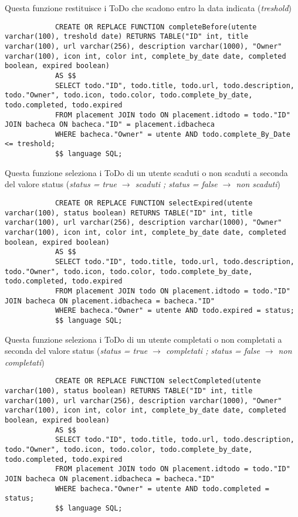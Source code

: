 \documentclass{article}
\begin{document}
		Questa funzione restituisce i ToDo che scadono entro la data indicata (\textit{treshold})
			\begin{lstlisting}
			CREATE OR REPLACE FUNCTION completeBefore(utente varchar(100), treshold date) RETURNS TABLE("ID" int, title varchar(100), url varchar(256), description varchar(1000), "Owner" varchar(100), icon int, color int, complete_by_date date, completed boolean, expired boolean)
			AS $$
			SELECT todo."ID", todo.title, todo.url, todo.description, todo."Owner", todo.icon, todo.color, todo.complete_by_date, todo.completed, todo.expired
			FROM placement JOIN todo ON placement.idtodo = todo."ID" JOIN bacheca ON bacheca."ID" = placement.idbacheca
			WHERE bacheca."Owner" = utente AND todo.complete_By_Date <= treshold;
			$$ language SQL;
		\end{lstlisting}
		\hfill \linebreak[2]
		
		Questa funzione seleziona i ToDo di un utente scaduti o non scaduti a seconda del valore status (\textit{status = true $\rightarrow$ scaduti ; status = false $\rightarrow$ non scaduti})
			\begin{lstlisting}
			CREATE OR REPLACE FUNCTION selectExpired(utente varchar(100), status boolean) RETURNS TABLE("ID" int, title varchar(100), url varchar(256), description varchar(1000), "Owner" varchar(100), icon int, color int, complete_by_date date, completed boolean, expired boolean)
			AS $$
			SELECT todo."ID", todo.title, todo.url, todo.description, todo."Owner", todo.icon, todo.color, todo.complete_by_date, todo.completed, todo.expired
			FROM placement JOIN todo ON placement.idtodo = todo."ID" JOIN bacheca ON placement.idbacheca = bacheca."ID"
			WHERE bacheca."Owner" = utente AND todo.expired = status;
			$$ language SQL;
		\end{lstlisting}
		\hfill \linebreak[2]
		
		Questa funzione seleziona i ToDo di un utente completati o non completati a seconda del valore status (\textit{status = true $\rightarrow$ completati ; status = false $\rightarrow$ non completati})
			\begin{lstlisting}
			CREATE OR REPLACE FUNCTION selectCompleted(utente varchar(100), status boolean) RETURNS TABLE("ID" int, title varchar(100), url varchar(256), description varchar(1000), "Owner" varchar(100), icon int, color int, complete_by_date date, completed boolean, expired boolean)
			AS $$
			SELECT todo."ID", todo.title, todo.url, todo.description, todo."Owner", todo.icon, todo.color, todo.complete_by_date, todo.completed, todo.expired
			FROM placement JOIN todo ON placement.idtodo = todo."ID" JOIN bacheca ON placement.idbacheca = bacheca."ID"
			WHERE bacheca."Owner" = utente AND todo.completed = status;
			$$ language SQL;
		\end{lstlisting}
	
\end{document}
